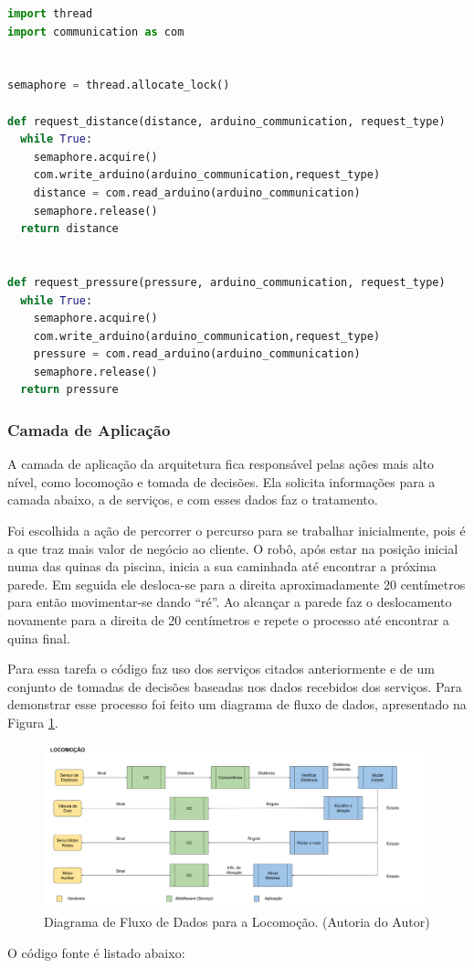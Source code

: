 \begin{lstlisting}[language=Python, label=services, caption=Código da Camada de Serviços - Serviço de Concorrência]
import thread
import communication as com


semaphore = thread.allocate_lock()

def request_distance(distance, arduino_communication, request_type)
  while True:
    semaphore.acquire()
    com.write_arduino(arduino_communication,request_type)
    distance = com.read_arduino(arduino_communication)
    semaphore.release()
  return distance


def request_pressure(pressure, arduino_communication, request_type)
  while True:
    semaphore.acquire()
    com.write_arduino(arduino_communication,request_type)
    pressure = com.read_arduino(arduino_communication)
    semaphore.release()
  return pressure
\end{lstlisting}

\subsubsection{Camada de Aplicação}
A camada de aplicação da arquitetura fica responsável pelas ações mais alto nível, como locomoção e tomada de decisões. Ela solicita informações para a camada abaixo, a de serviços, e com esses dados faz o tratamento.

Foi escolhida a ação de percorrer o percurso para se trabalhar inicialmente, pois é a que traz mais valor de negócio ao cliente. O robô, após estar na posição inicial numa das quinas da piscina, inicia a sua caminhada até encontrar a próxima parede. Em seguida ele desloca-se para a direita aproximadamente 20 centímetros para então movimentar-se dando “ré”. Ao alcançar a parede faz o deslocamento novamente para a direita de 20 centímetros e repete o processo até encontrar a quina final.

Para essa tarefa o código faz uso dos serviços citados anteriormente e de um conjunto de tomadas de decisões baseadas nos dados recebidos dos serviços. Para demonstrar esse processo foi feito um diagrama de fluxo de dados, apresentado na Figura \ref{fig:move-dfd}.
\par
\begin{figure}[h]
  \centering
  \includegraphics[width=\textwidth]{figures/move-dfd.png}
  \caption{Diagrama de Fluxo de Dados para a Locomoção. (\textsf{Autoria do Autor})}
  \label{fig:move-dfd}
\end{figure}
\FloatBarrier
\par
O código fonte é listado abaixo:

